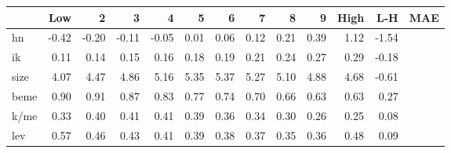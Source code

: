 \begin{tabular}{lrrrrrrrrrrrl}
\toprule
{} &   Low &     2 &     3 &     4 &     5 &     6 &     7 &     8 &     9 &  High &   L-H & MAE \\
\midrule
hn   & -0.42 & -0.20 & -0.11 & -0.05 &  0.01 &  0.06 &  0.12 &  0.21 &  0.39 &  1.12 & -1.54 &     \\
ik   &  0.11 &  0.14 &  0.15 &  0.16 &  0.18 &  0.19 &  0.21 &  0.24 &  0.27 &  0.29 & -0.18 &     \\
size &  4.07 &  4.47 &  4.86 &  5.16 &  5.35 &  5.37 &  5.27 &  5.10 &  4.88 &  4.68 & -0.61 &     \\
beme &  0.90 &  0.91 &  0.87 &  0.83 &  0.77 &  0.74 &  0.70 &  0.66 &  0.63 &  0.63 &  0.27 &     \\
k/me &  0.33 &  0.40 &  0.41 &  0.41 &  0.39 &  0.36 &  0.34 &  0.30 &  0.26 &  0.25 &  0.08 &     \\
lev  &  0.57 &  0.46 &  0.43 &  0.41 &  0.39 &  0.38 &  0.37 &  0.35 &  0.36 &  0.48 &  0.09 &     \\
\bottomrule
\end{tabular}
